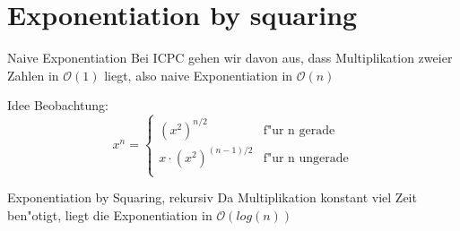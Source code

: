 \documentclass[18pt]{beamer}
\begin{document}
\section {Exponentiation by squaring}
\begin{frame} {Naive Exponentiation}
Bei ICPC gehen wir davon aus, dass Multiplikation zweier Zahlen in $\mathcal{O}(1)$ liegt, also naive Exponentiation in $\mathcal{O}(n)$
\end{frame}

\begin{frame} {Idee}
Beobachtung:
\begin{equation}
   x^{n} =
   \begin{cases}
     (x^{2})^{n/2} & \text{f"ur n gerade} \\
      x\cdot(x^{2})^{(n-1)/2} & \text{f"ur n ungerade} \\
   \end{cases}
\end{equation}
\end{frame}

\begin{frame} {Exponentiation by Squaring, rekursiv}
Da Multiplikation konstant viel Zeit ben"otigt, liegt die Exponentiation in $\mathcal{O}(log(n))$
\end{frame}
\end{document}
